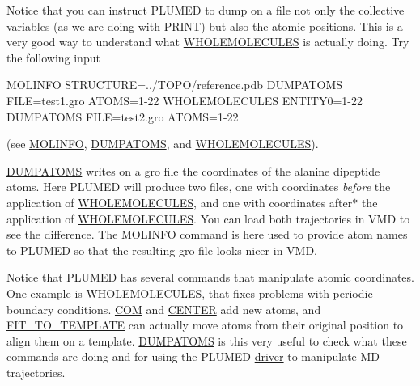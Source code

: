 Notice that you can instruct P\+L\+U\+M\+E\+D to dump on a file not only the collective variables (as we are doing with \hyperlink{PRINT}{P\+R\+I\+N\+T}) but also the atomic positions. This is a very good way to understand what \hyperlink{WHOLEMOLECULES}{W\+H\+O\+L\+E\+M\+O\+L\+E\+C\+U\+L\+E\+S} is actually doing. Try the following input

\begin{DoxyVerb}MOLINFO STRUCTURE=../TOPO/reference.pdb
DUMPATOMS FILE=test1.gro ATOMS=1-22
WHOLEMOLECULES ENTITY0=1-22
DUMPATOMS FILE=test2.gro ATOMS=1-22
\end{DoxyVerb}
 (see \hyperlink{MOLINFO}{M\+O\+L\+I\+N\+F\+O}, \hyperlink{DUMPATOMS}{D\+U\+M\+P\+A\+T\+O\+M\+S}, and \hyperlink{WHOLEMOLECULES}{W\+H\+O\+L\+E\+M\+O\+L\+E\+C\+U\+L\+E\+S}).

\hyperlink{DUMPATOMS}{D\+U\+M\+P\+A\+T\+O\+M\+S} writes on a gro file the coordinates of the alanine dipeptide atoms. Here P\+L\+U\+M\+E\+D will produce two files, one with coordinates {\itshape before} the application of \hyperlink{WHOLEMOLECULES}{W\+H\+O\+L\+E\+M\+O\+L\+E\+C\+U\+L\+E\+S}, and one with coordinates after$\ast$ the application of \hyperlink{WHOLEMOLECULES}{W\+H\+O\+L\+E\+M\+O\+L\+E\+C\+U\+L\+E\+S}. You can load both trajectories in V\+M\+D to see the difference. The \hyperlink{MOLINFO}{M\+O\+L\+I\+N\+F\+O} command is here used to provide atom names to P\+L\+U\+M\+E\+D so that the resulting gro file looks nicer in V\+M\+D.

Notice that P\+L\+U\+M\+E\+D has several commands that manipulate atomic coordinates. One example is \hyperlink{WHOLEMOLECULES}{W\+H\+O\+L\+E\+M\+O\+L\+E\+C\+U\+L\+E\+S}, that fixes problems with periodic boundary conditions. \hyperlink{COM}{C\+O\+M} and \hyperlink{CENTER}{C\+E\+N\+T\+E\+R} add new atoms, and \hyperlink{FIT_TO_TEMPLATE}{F\+I\+T\+\_\+\+T\+O\+\_\+\+T\+E\+M\+P\+L\+A\+T\+E} can actually move atoms from their original position to align them on a template. \hyperlink{DUMPATOMS}{D\+U\+M\+P\+A\+T\+O\+M\+S} is this very useful to check what these commands are doing and for using the P\+L\+U\+M\+E\+D \hyperlink{driver}{driver} to manipulate M\+D trajectories.




